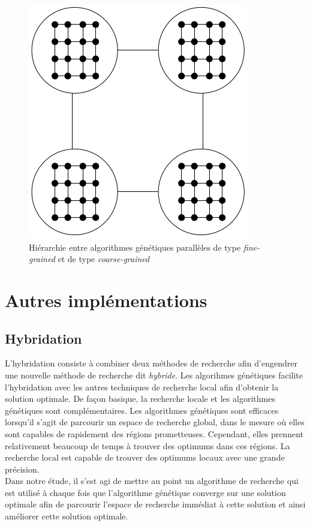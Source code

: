 \documentclass[12pt,a4paper]{article}
\begin{document}
	\begin{figure}[!h]
		\begin{center}
			\includegraphics[scale=.3]{img/hierar_fine_grained_fig.png}
			\caption{Hiérarchie entre algorithmes génétiques parallèles de type \emph{fine-grained} et de type \emph{coarse-grained}}
			\label{fig:hierar_fine_grained_fig}
		\end{center}
	\end{figure} 
	\section{Autres implémentations}
	\subsection{Hybridation}
	L'hybridation consiste à combiner deux méthodes de recherche afin d'engendrer une nouvelle méthode de recherche dit \emph{hybride}. Les algorihmes génétiques facilite l'hybridation avec les autres techniques de recherche local afin d'obtenir la solution optimale. De façon basique, la recherche locale et les algorithmes génétiques sont complémentaires. Les algorithmes génétiques sont efficaces lorsqu'il s'agit de parcourir un espace de recherche global, dans le mesure où elles sont capables de rapidement des régions prometteuses. Cependant, elles prennent relativement beaucoup de temps à trouver des optimums dans ces régions. La recherche local est capable de trouver des optimums locaux avec une grande précision. \\
	\hspace*{.5cm} Dans notre étude, il s'est agi de mettre au point un algorithme de recherche qui est utilisé à chaque fois que l'algorithme génétique converge sur une solution optimale afin de parcourir l'espace de recherche immédiat à cette solution et ainsi améliorer cette solution optimale. 
	
\end{document}
